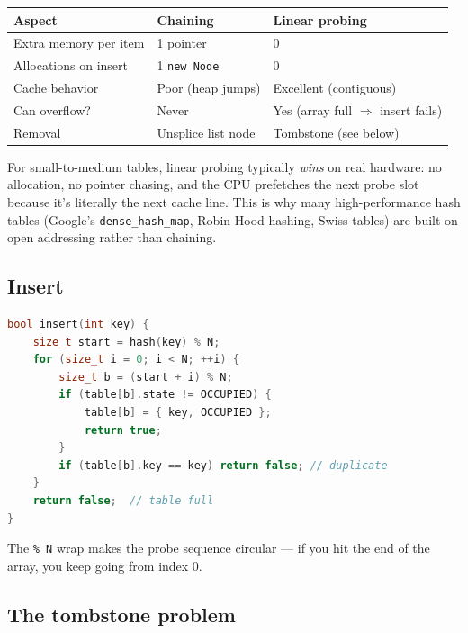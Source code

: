 \documentclass[11pt]{article}
\begin{document}
\begin{center}
\begin{tabular}{|l|l|l|}
\hline
\textbf{Aspect} & \textbf{Chaining} & \textbf{Linear probing} \\
\hline
Extra memory per item & 1 pointer  & 0 \\
Allocations on insert & 1 \texttt{new Node} & 0 \\
Cache behavior        & Poor (heap jumps) & Excellent (contiguous) \\
Can overflow?         & Never     & Yes (array full $\Rightarrow$ insert fails) \\
Removal               & Unsplice list node & Tombstone (see below) \\
\hline
\end{tabular}
\end{center}

For small-to-medium tables, linear probing typically \emph{wins}
on real hardware: no allocation, no pointer chasing, and the CPU
prefetches the next probe slot because it's literally the next
cache line. This is why many high-performance hash tables (Google's
\texttt{dense\_hash\_map}, Robin Hood hashing, Swiss tables) are
built on open addressing rather than chaining.

\subsection*{Insert}

\begin{examplebox}
\begin{lstlisting}[language=C++,basicstyle=\ttfamily\small,frame=single]
bool insert(int key) {
    size_t start = hash(key) % N;
    for (size_t i = 0; i < N; ++i) {
        size_t b = (start + i) % N;
        if (table[b].state != OCCUPIED) {
            table[b] = { key, OCCUPIED };
            return true;
        }
        if (table[b].key == key) return false; // duplicate
    }
    return false;  // table full
}
\end{lstlisting}
\end{examplebox}

The \texttt{\% N} wrap makes the probe sequence circular --- if
you hit the end of the array, you keep going from index 0.

\subsection*{The tombstone problem}
\end{document}
